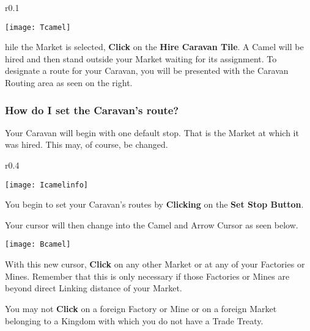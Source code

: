 \begin{wrapfigure}{r}{0.1\textwidth}
    \vspace{-20pt}
    \begin{center}
        \texttt{[image: Tcamel]} %
    \end{center}
    \vspace{-20pt}
\end{wrapfigure}


hile the Market is selected, \textbf{Click} on the \textbf{Hire Caravan Tile}. A Camel will be hired and then stand outside your Market waiting for its assignment. To designate a route for your Caravan, you will be presented with the Caravan Routing area as seen on the right.

\subsubsection{\textsf{How do I set the Caravan’s route?}}


Your Caravan will begin with one default stop. That is the Market at which it was hired. This may, of course, be changed.

\begin{wrapfigure}{r}{0.4\textwidth}
	\vspace{-20pt}
	\begin{center}
		\texttt{[image: Icamelinfo]} %
	\end{center}
	\vspace{-20pt}
\end{wrapfigure}

You begin to set your Caravan’s routes by \textbf{Clicking} on the \textbf{Set Stop Button}.

Your cursor will then change into the Camel and Arrow Cursor as seen below.

\texttt{[image: Bcamel]}

With this new cursor, \textbf{Click} on any other Market or at any of your Factories or Mines. Remember that this is only necessary if those Factories or Mines are beyond direct Linking distance of your Market.

You may not \textbf{Click} on a foreign Factory or Mine or on a foreign Market belonging to a Kingdom with which you do not have a Trade Treaty.

